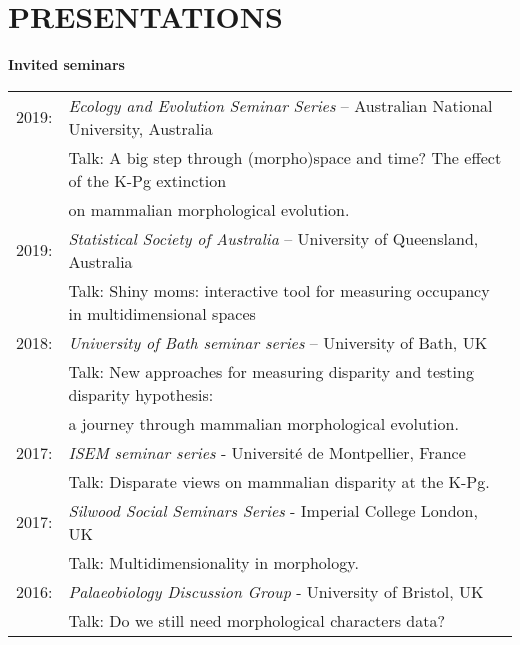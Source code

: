 \documentclass[10pt,a4paper]{article}
\begin{document}
{\section{PRESENTATIONS}

\raggedright\textbf{Invited seminars}\\[1.5ex]
\begin{tabular}{ll}
2019: & \textit{Ecology and Evolution Seminar Series} – Australian National University, Australia\\
      & Talk: A big step through (morpho)space and time? The effect of the K-Pg extinction\\
      & on mammalian morphological evolution.\\
2019: & \textit{Statistical Society of Australia} – University of Queensland, Australia\\
      & Talk: Shiny moms: interactive tool for measuring occupancy in multidimensional spaces\\
2018: & \textit{University of Bath seminar series} – University of Bath, UK\\
      & Talk: New approaches for measuring disparity and testing disparity hypothesis:\\
      & a journey through mammalian morphological evolution.\\
2017: & \textit{ISEM seminar series} - Universit\'{e} de Montpellier, France\\
      & Talk: Disparate views on mammalian disparity at the K-Pg.\\ 
2017: & \textit{Silwood Social Seminars Series} - Imperial College London, UK\\
      & Talk: Multidimensionality in morphology.\\ 
2016: & \textit{Palaeobiology Discussion Group} - University of Bristol, UK\\
      & Talk: Do we still need morphological characters data?\\ 
\end{tabular}

}
\end{document}
